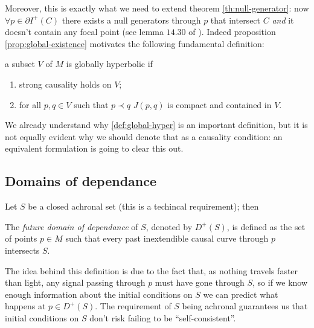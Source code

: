 Moreover, this is exactly what we need to extend theorem \ref{th:null-generator}: now \(\forall p\in \partial I^+(C)\)  there exists a null generators through \(p\) that intersect \(C\) \emph{and} it doesn't contain any focal point (see lemma \(14.30\) of \cite{o1983semi}).
Indeed proposition \ref{prop:global-existence} motivates the following fundamental definition:
\begin{definition}
	\label{def:global-hyper}
	a subset \(V\) of \(M\) is globally hyperbolic if 
	\begin{enumerate}
		\item strong causality holds on \(V\);
  		\item for all \(p, q \in V\) such that \(p \prec q\) \(J(p,q)\) is compact and contained in \(V\).
	\end{enumerate}
\end{definition}

We already understand why \ref{def:global-hyper} is an important definition, but it is not equally evident why we should denote that as a causality condition: an equivalent formulation is going to clear this out.

\subsection{Domains of dependance}
Let \(S\) be a closed achronal set (this is a techincal requirement); then
\begin{definition}
	The \emph{future domain of dependance} of \(S\), denoted by \(D^+(S)\), is defined as
	the set of points \(p\in M\) such that every past inextendible causal curve through \(p\) intersects \(S\).
\end{definition}

The idea behind this definition is due to the fact that, as nothing travels faster than light, any signal passing through \(p\) must have gone through \(S\), so if we know enough information about the initial conditions on \(S\) we can predict what happens at \(p\in D^+(S)\). The requirement of \(S\) being achronal guarantees us that initial conditions on \(S\) don't risk failing to be ``self-consistent''.

